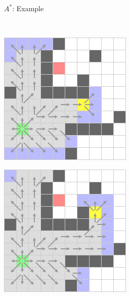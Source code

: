 \documentclass{presentation}
\begin{document}
\begin{frame}{$A^*$: Example}
\begin{minipage}{0.23\textwidth}
	\end{minipage}\\
	\vspace{2mm}
	\begin{minipage}{0.23\textwidth}
		\includegraphics[width=\textwidth]{figures/A-Stern_geschnitten(241x241)/9.png}
	\end{minipage}%
	\hfill%
	\begin{minipage}{0.23\textwidth}
		\includegraphics[width=\textwidth]{figures/A-Stern_geschnitten(241x241)/10.png}

\end{minipage}
\end{frame}
\end{document}
